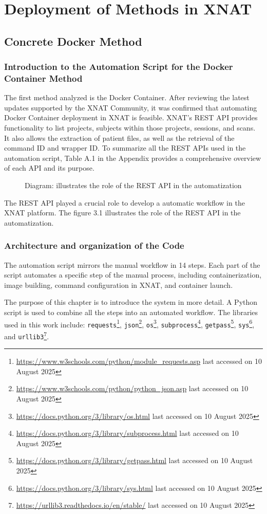 \chapter{Deployment of Methods in XNAT}
\section{Concrete Docker Method}


\subsection{Introduction to the Automation Script for the Docker Container Method}
The first method analyzed is the Docker Container. After reviewing the latest updates supported by the XNAT Community, it was confirmed that automating Docker Container deployment in XNAT is feasible.
XNAT's REST API provides functionality to list projects, subjects within those projects, sessions, and scans. It also allows the extraction of patient files, as well as the retrieval of the command ID and wrapper ID.
To summarize all the REST APIs used in the automation script, Table A.1 in the Appendix provides a comprehensive overview of each API and its purpose.

\begin{figure}[H]
    \centering
    \def\svgwidth{0.9\linewidth}
    
    \caption{Diagram: illustrates the role of the REST API in the automatization}
    \label{fig:workflow-steps}
\end{figure}


The REST API played a crucial role to develop a automatic workflow in the XNAT platform. The figure 3.1 illustrates the role of the REST API in the automatization.



\subsection{Architecture and organization of the Code}
The automation script mirrors the manual workflow in 14 steps. Each part of the script automates a specific step of the manual process, including containerization, image building, command configuration in XNAT, and container launch.

The purpose of this chapter is to introduce the system in more detail. A Python script is used to combine all the steps into an automated workflow. The libraries used in this work include: \texttt{requests}\footnote{\url{https://www.w3schools.com/python/module_requests.asp} last accessed on 10 August 2025}, \texttt{json}\footnote{\url{https://www.w3schools.com/python/python_json.asp} last accessed on 10 August 2025}, \texttt{os}\footnote{\url{https://docs.python.org/3/library/os.html} last accessed on 10 August 2025}, \texttt{subprocess}\footnote{\url{https://docs.python.org/3/library/subprocess.html} last accessed on 10 August 2025}, \texttt{getpass}\footnote{\url{https://docs.python.org/3/library/getpass.html} last accessed on 10 August 2025}, \texttt{sys}\footnote{\url{https://docs.python.org/3/library/sys.html} last accessed on 10 August 2025}, and \texttt{urllib3}\footnote{\url{https://urllib3.readthedocs.io/en/stable/} last accessed on 10 August 2025}.

